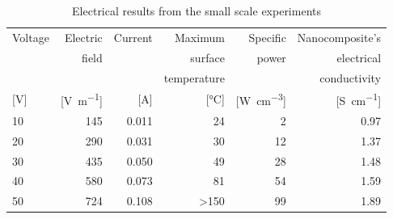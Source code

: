 \documentclass[11pt,review,times]{elsarticle}
\begin{document}
\begin{table}[htb]
\centering
\begin{tabular}{@{}lrrrrr@{}}
\toprule
Voltage 			& Electric					& Current 			& Maximum  					& Specific   						& Nanocomposite's \\ 
 					& field						&  						& surface 					& power   							& electrical \\ 
 					& 								&  						& temperature 				&    									& conductivity \\
{[}\si{\V}{]} 	& {[}\si{\V\per\m}{]} 	& {[}\si{\A}{]} 	& {[}\si{\celsius}{]} 	& {[}\si{\W\per\cubic\cm}{]}	& {[}\si{\siemens\per\cm}{]} \\ \midrule
10 					& 145							& 0.011 				& 24 							& 2		  								& 0.97 \\
20					& 290							& 0.031 				& 30 							& 12	 								& 1.37 \\
30 					& 435							& 0.050 				& 49 							& 28	 								& 1.48 \\
40 					& 580							& 0.073 				& 81 							& 54	 								& 1.59 \\
50 					& 724							& 0.108 				& \textgreater 150 		& 99	 								& 1.89 \\ \bottomrule
\end{tabular}%
\caption{Electrical results from the small scale experiments}
\label{tab:results_lab}
\end{table}
\end{document}
